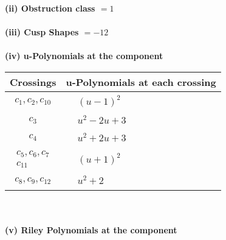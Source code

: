 \documentclass[1p]{elsarticle_modified}
\theoremstyle{definition}
\begin{document}
\flushleft \textbf{(ii) Obstruction class $= 1$}\\~\\
\flushleft \textbf{(iii) Cusp Shapes $= -12$}\\~\\
\newpage\renewcommand{\arraystretch}{1}
\flushleft \textbf{(iv) u-Polynomials at the component}\newline \\
\begin{tabular}{m{50pt}|m{274pt}}
Crossings & \hspace{64pt}u-Polynomials at each crossing \\
\hline $$\begin{aligned}c_{1},c_{2},c_{10}\end{aligned}$$&$\begin{aligned}
&(u-1)^2
\end{aligned}$\\
\hline $$\begin{aligned}c_{3}\end{aligned}$$&$\begin{aligned}
&u^2-2 u+3
\end{aligned}$\\
\hline $$\begin{aligned}c_{4}\end{aligned}$$&$\begin{aligned}
&u^2+2 u+3
\end{aligned}$\\
\hline $$\begin{aligned}c_{5},c_{6},c_{7}\\c_{11}\end{aligned}$$&$\begin{aligned}
&(u+1)^2
\end{aligned}$\\
\hline $$\begin{aligned}c_{8},c_{9},c_{12}\end{aligned}$$&$\begin{aligned}
&u^2+2
\end{aligned}$\\
\hline
\end{tabular}\\~\\
\newpage\renewcommand{\arraystretch}{1}
\flushleft \textbf{(v) Riley Polynomials at the component}\newline \\
\end{document}
